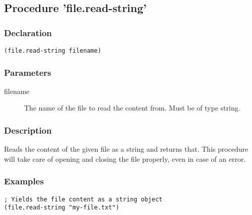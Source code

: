 \subsection{Procedure 'file.read-string'}
\label{builtins/file.read-string}

\subsubsection*{Declaration}
\begin{lstlisting}
(file.read-string filename)
\end{lstlisting}

\subsubsection*{Parameters}
\begin{description}
	\item[filename] The name of the file to read the content from. Must be of type string.
\end{description}

\subsubsection*{Description}
Reads the content of the given file as a string and returns that. This procedure will take care of opening and closing the file properly, even in case of an error.

\subsubsection*{Examples}
\begin{lstlisting}
; Yields the file content as a string object
(file.read-string "my-file.txt")
\end{lstlisting}
